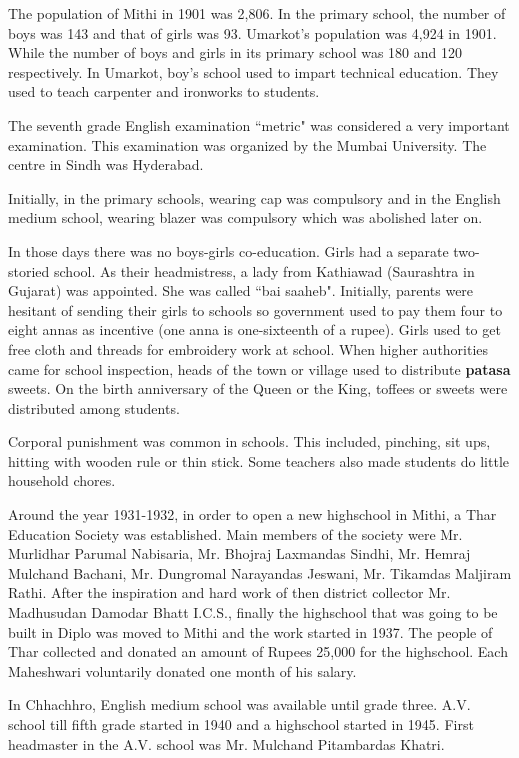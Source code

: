 The population of Mithi in 1901 was 2,806. In the primary school, the number of
boys was 143 and that of girls was 93. Umarkot's population was 4,924 in 1901. While the
number of boys and girls in its primary school was 180 and 120 respectively. In
Umarkot, boy's school used to impart technical education. They used to teach
carpenter and ironworks to students. 

The seventh grade English examination ``metric" was considered a very important
examination. This examination was organized by the Mumbai University. The centre
in Sindh was Hyderabad.

Initially, in the primary schools, wearing cap was compulsory and in the English
medium school, wearing blazer was compulsory which was abolished later on.

In those days there was no boys-girls co-education. Girls had a separate
two-storied school. As their headmistress, a lady from Kathiawad (Saurashtra in
Gujarat) was appointed. She was called ``bai saaheb". Initially, parents were
hesitant of sending their girls to schools so government used to pay them four
to eight annas as incentive (one anna is one-sixteenth of a rupee). Girls used
to get free cloth and threads for embroidery work at school. When higher
authorities came for school inspection, heads of the town or village used to
distribute \textbf{patasa} sweets. On the birth anniversary of the Queen or the
King, toffees or sweets were distributed among students.

Corporal punishment was common in schools. This included, pinching, sit ups,
hitting with wooden rule or thin stick. Some teachers also made students do
little household chores.

Around the year 1931-1932, in order to open a new highschool in Mithi, a Thar
Education Society was established. Main members of the society were Mr.
Murlidhar Parumal Nabisaria, Mr. Bhojraj Laxmandas Sindhi, Mr. Hemraj Mulchand
Bachani, Mr. Dungromal Narayandas Jeswani, Mr. Tikamdas Maljiram Rathi. After
the inspiration and hard work of then district collector Mr. Madhusudan Damodar
Bhatt I.C.S., finally the highschool that was going to be built in Diplo was
moved to Mithi and the work started in 1937. The people of Thar collected and
donated an amount of Rupees 25,000 for the highschool. Each Maheshwari
voluntarily donated one month of his salary.

In Chhachhro, English medium school was available until grade three. A.V. school
till fifth grade started in 1940 and a highschool started in 1945. First
headmaster in the A.V. school was Mr. Mulchand Pitambardas Khatri.

